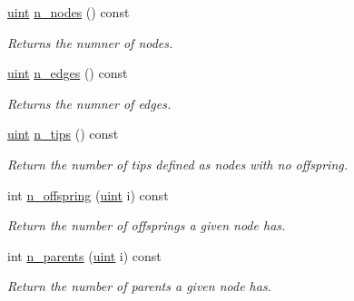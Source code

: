 \begin{DoxyCompactItemize}
\mbox{\label{classpruner_1_1Tree_a845214fea61d73ee2c1ceffedc92a6ad}} 
\hyperlink{namespacepruner_a659e6e64a9e2b8e981c3d34262a2f67e}{uint} \hyperlink{classpruner_1_1Tree_a845214fea61d73ee2c1ceffedc92a6ad}{n\+\_\+nodes} () const
\begin{DoxyCompactList}\small\item\em Returns the numner of nodes. \end{DoxyCompactList}\item 
\mbox{\label{classpruner_1_1Tree_a9fddfab43bc49c3e85f2383b59904569}} 
\hyperlink{namespacepruner_a659e6e64a9e2b8e981c3d34262a2f67e}{uint} \hyperlink{classpruner_1_1Tree_a9fddfab43bc49c3e85f2383b59904569}{n\+\_\+edges} () const
\begin{DoxyCompactList}\small\item\em Returns the numner of edges. \end{DoxyCompactList}\item 
\mbox{\label{classpruner_1_1Tree_a024c90c0554251bcd74c63eb3ddf0e4f}} 
\hyperlink{namespacepruner_a659e6e64a9e2b8e981c3d34262a2f67e}{uint} \hyperlink{classpruner_1_1Tree_a024c90c0554251bcd74c63eb3ddf0e4f}{n\+\_\+tips} () const
\begin{DoxyCompactList}\small\item\em Return the number of tips defined as nodes with no offspring. \end{DoxyCompactList}\item 
\mbox{\label{classpruner_1_1Tree_a5466973735b473cd476777ef91b04688}} 
int \hyperlink{classpruner_1_1Tree_a5466973735b473cd476777ef91b04688}{n\+\_\+offspring} (\hyperlink{namespacepruner_a659e6e64a9e2b8e981c3d34262a2f67e}{uint} i) const
\begin{DoxyCompactList}\small\item\em Return the number of offsprings a given node has. \end{DoxyCompactList}\item 
\mbox{\label{classpruner_1_1Tree_a374a4d88df374186717de41f035416ca}} 
int \hyperlink{classpruner_1_1Tree_a374a4d88df374186717de41f035416ca}{n\+\_\+parents} (\hyperlink{namespacepruner_a659e6e64a9e2b8e981c3d34262a2f67e}{uint} i) const
\begin{DoxyCompactList}\small\item\em Return the number of parents a given node has. \end{DoxyCompactList}\item 

\end{DoxyCompactItemize}
